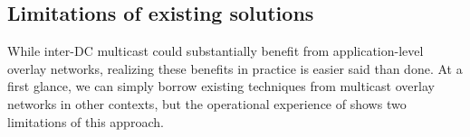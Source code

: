 
%
%
%
%

\subsection{Limitations of existing solutions}
\label{subsec:motivation:baseline}

While inter-DC multicast could
substantially benefit from application-level overlay networks,
realizing these benefits in practice
is easier said than done.
At a first glance, we can simply borrow existing techniques
from multicast overlay networks in other contexts,
but the operational experience of \company shows
two limitations of this approach.


